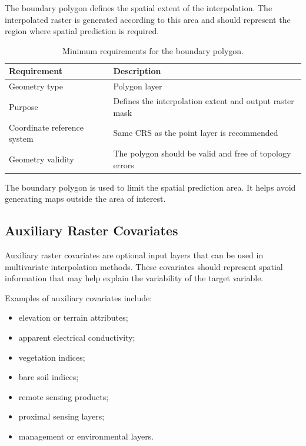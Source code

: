 \documentclass[11pt,a4paper]{article}
\begin{document}
The boundary polygon defines the spatial extent of the interpolation. The interpolated raster is generated according to this area and should represent the region where spatial prediction is required.

\begin{table}[H]
\centering
\caption{Minimum requirements for the boundary polygon.}
\begin{tabular}{P{5cm} P{8cm}}
\toprule
\textbf{Requirement} & \textbf{Description} \\
\midrule
Geometry type & Polygon layer \\
Purpose & Defines the interpolation extent and output raster mask \\
Coordinate reference system & Same CRS as the point layer is recommended \\
Geometry validity & The polygon should be valid and free of topology errors \\
\bottomrule
\end{tabular}
\end{table}

\begin{infobox}
The boundary polygon is used to limit the spatial prediction area. It helps avoid generating maps outside the area of interest.
\end{infobox}

\subsection{Auxiliary Raster Covariates}

Auxiliary raster covariates are optional input layers that can be used in multivariate interpolation methods. These covariates should represent spatial information that may help explain the variability of the target variable.

Examples of auxiliary covariates include:

\begin{itemize}
    \item elevation or terrain attributes;
    \item apparent electrical conductivity;
    \item vegetation indices;
    \item bare soil indices;
    \item remote sensing products;
    \item proximal sensing layers;
    \item management or environmental layers.
\end{itemize}
\end{document}
